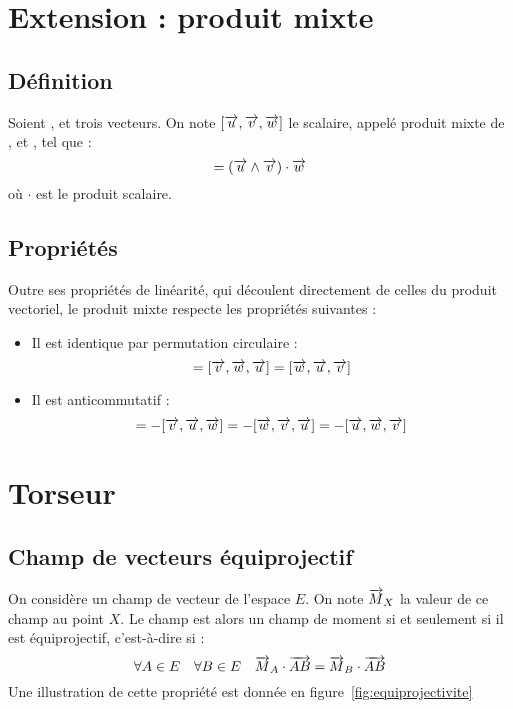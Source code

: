 \section{Extension : produit mixte}
	\subsection{Définition}
		\begin{definition}
			Soient ,  et  trois vecteurs. On note $[\overrightarrow{u}, \overrightarrow{v}, \overrightarrow{w}]$ le scalaire, appelé produit mixte de ,  et , tel que :
			\begin{equation}
				[\vect{u}, \vect{v}, \vect{w}]=\left(\vect{u}\wedge\vect{v}\right)\cdot\vect{w}
			\end{equation}
			où $\cdot$ est le produit scalaire.
		\end{definition}
		
	\subsection{Propriétés}
		\label{sec:props-prodmixte}
		Outre ses propriétés de linéarité, qui découlent directement de celles du produit vectoriel, le produit mixte respecte les propriétés suivantes :
		\begin{itemize}
			\item Il est identique par permutation circulaire :
			\begin{equation}
				[\vect{u}, \vect{v}, \vect{w}]=[\vect{v}, \vect{w},\vect{u}]=[\vect{w},\vect{u}, \vect{v}]
			\end{equation}
			\item Il est anticommutatif :
			\begin{equation}
				[\vect{u}, \vect{v}, \vect{w}]=-[\vect{v},\vect{u},\vect{w}]=-[\vect{w},\vect{v}, \vect{u}]=-[\vect{u}, \vect{w}, \vect{v}]
			\end{equation}			
		\end{itemize}
		
		
\section{Torseur}
	\subsection{Champ de vecteurs équiprojectif}
On considère un champ de vecteur de l'espace $E$. On note $\overrightarrow{M}_X$ la valeur de ce champ au point $X$. Le champ est alors un champ de moment si et seulement si il est équiprojectif, c'est-à-dire si :
\begin{equation}
	\forall A\in E\quad \forall B\in E \quad \overrightarrow{M}_A\cdot\overrightarrow{AB}=\overrightarrow{M}_B\cdot\overrightarrow{AB}
\end{equation}
Une illustration de cette propriété est donnée en figure~\ref{fig:equiprojectivite}

